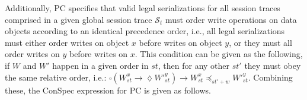 \documentclass[journal,compsoc]{IEEEtran}
\begin{document}
  \par Additionally, PC specifies that  valid legal serializations for all session traces comprised in a given global session trace $\mathcal{S}_t$ must order write operations on data objects according to an identical precedence order, i.e., all legal serializations must either order writes on object $x$ before writes on object $y$, or they must all order writes on $y$ before writes on $x$. 
  This condition can be given as the following, if $W$ and $W'$ happen in a given order in $st$, then for any other $st'$ they must obey the same relative order, i.e.:
  $ \square \left( W_\mathit{st}^{x} \rightarrow \lozenge {W'}_\mathit{st}^{y} \right) 
 \rightarrow W_\mathit{st}^x \preccurlyeq_{\mathit{st'}+w} 
 {W'}_\mathit{st}^{y}$.
   Combining these, the ConSpec expression for PC is given as follows.  %
\end{document}
